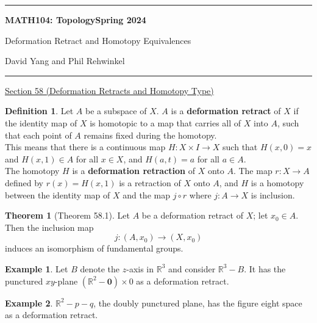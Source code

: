 \documentclass[11pt]{article}
\newcommand{\R}{\mathbb{R}}
\theoremstyle{definition}
\theoremstyle{theorem}
\newtheorem*{definition}{Definition}
\newtheorem*{theorem}{Theorem}
\newtheorem*{eg}{Example}
\begin{document}
	\hrule
	\begin{center}
        \textbf{MATH104: Topology}\hfill \textbf{Spring 2024}\newline

		{\Large Deformation Retract and Homotopy Equivalences}

		David Yang and Phil Rehwinkel
	\end{center}

\hrule

\vspace{1em}

\underline{Section 58 (Deformation Retracts and Homotopy Type)} \\

\begin{definition}
Let $A$ be a subspace of $X$. $A$ is a \textbf{deformation retract} of $X$ if the identity map of $X$ is homotopic to a map that carries all of $X$ into $A$, such that each point of $A$ remains fixed during the homotopy. \\

This means that there is a continuous map $H \colon X \times I \rightarrow X$ such that $H(x, 0) = x$ and $H(x, 1) \in A$ for all $x \in X$, and $H(a, t) = a$ for all $a \in A$. \\

The homotopy $H$ is a \textbf{deformation retraction} of $X$ onto $A$. The map $r \colon X \rightarrow A$ defined by $r(x) = H(x, 1)$ is a retraction of $X$ onto $A$, and $H$ is a homotopy between the identity map of $X$ and the map $j \circ r$ where $j \colon A \rightarrow X$ is inclusion.
\end{definition}

\begin{theorem}[Theorem 58.1]
Let $A$ be a deformation retract of $X$; let $x_0 \in A$. Then the inclusion map
\[
    j \colon (A, x_0) \rightarrow (X, x_0)
\]
induces an isomorphism of fundamental groups.
\end{theorem}

\begin{eg}
Let $B$ denote the $z$-axis in $\R^3$ and consider $\R^3 - B$. It has the punctured $xy$-plane $(\R^2 - \mathbf{0}) \times 0$ as a deformation retract.
\end{eg}

\begin{eg}
$\R^2 - p - q$, the doubly punctured plane, has the figure eight space as a deformation retract.
\end{eg}
\end{document}
